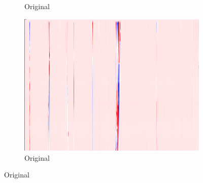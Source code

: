 \begin{figure}[!h]
\begin{subfigure}{0.33\textwidth}
        \caption{Original}
    \end{subfigure}%
    \hfill
    \begin{subfigure}{0.33\textwidth}
        \includegraphics[width=\textwidth]{figures/test.png}
        \caption{Original}
    \end{subfigure}
    
    \vspace{1em}
    

\end{figure}
